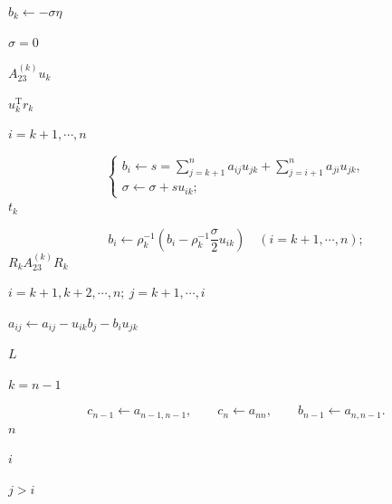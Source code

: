 \documentclass[UTF8,fontset=fandol]{ctexart}
\begin{document}
$b_k\leftarrow-\sigma\eta$\par
$\sigma=0$\par
$A_{23}^{(k)}u_k$\par
$u_k^{\mathrm T}r_k$\par
$i=k+1,\cdots,n$\par
\[
\begin{cases}
b_i\leftarrow s=\displaystyle\sum_{j=k+1}^{n}a_{ij}u_{jk}+\displaystyle\sum_{j=i+1}^{n}a_{ji}u_{jk},\\
\sigma\leftarrow\sigma+su_{ik};
\end{cases}
\]
$t_k$\par
\[
b_i\leftarrow\rho_k^{-1}\left(b_i-\rho_k^{-1}\frac\sigma2u_{ik}\right)
\quad(i=k+1,\cdots,n);
\]
$R_kA_{23}^{(k)}R_k$\par
$i=k+1,k+2,\cdots,n;\ j=k+1,\cdots,i$\par
$a_{ij}\leftarrow a_{ij}-u_{ik}b_j-b_iu_{jk}$\par
$L$\par
$k=n-1$\par
\[
c_{n-1}\leftarrow a_{n-1,n-1},\qquad c_n\leftarrow a_{nn},\qquad b_{n-1}\leftarrow a_{n,n-1}.
\]
$n$\par
$i$\par
$j>i$\par
\clearpage
\end{document}
